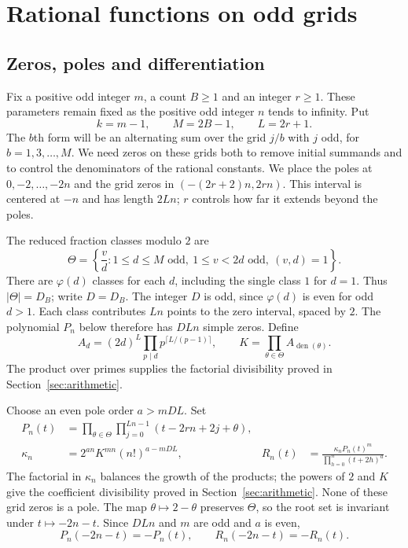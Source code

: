 \section{Rational functions on odd grids}\label{sec:construction}

\subsection{Zeros, poles and differentiation}

Fix a positive odd integer $m$, a count $B\ge1$ and an integer
$r\ge1$. These parameters remain fixed as the positive odd
integer $n$ tends to infinity. Put
\[
 k=m-1,\qquad M=2B-1,\qquad L=2r+1.
\]
The $b$th form will be an alternating sum over the grid $j/b$
with $j$ odd, for $b=1,3,\ldots,M$. We need zeros on these
grids both to remove initial summands and to control the
denominators of the rational constants.
We place the poles at $0,-2,\ldots,-2n$ and the grid zeros in
$(-(2r+2)n,2rn)$. This interval is centered at $-n$ and has
length $2Ln$; $r$ controls how far it extends beyond the poles.

The reduced fraction classes modulo $2$ are
\[
 \Theta=\left\{\frac vd:
 1\le d\le M\text{ odd},\ 1\le v<2d\text{ odd},\ (v,d)=1\right\}.
\]
There are $\varphi(d)$ classes for each $d$, including the single
class $1$ for $d=1$. Thus $|\Theta|=D_B$; write $D=D_B$.
The integer $D$ is odd, since $\varphi(d)$ is even for odd $d>1$.
Each class contributes $Ln$ points to the zero interval, spaced
by $2$. The polynomial $P_n$ below therefore has $DLn$ simple zeros.
Define
\begin{equation}\label{eq:K}
 A_d=(2d)^L\prod_{p\mid d}p^{\lceil L/(p-1)\rceil},
 \qquad K=\prod_{\theta\in\Theta}A_{\operatorname{den}(\theta)}.
\end{equation}
The product over primes supplies the factorial divisibility
proved in Section~\ref{sec:arithmetic}.

Choose an even pole order $a>mDL$. Set
\begin{align}
 P_n(t)&=\prod_{\theta\in\Theta}\prod_{j=0}^{Ln-1}
                      (t-2rn+2j+\theta),\label{eq:P}\\
 \kappa_n&=2^{an}K^{mn}(n!)^{a-mDL},
 &R_n(t)&=\frac{\kappa_nP_n(t)^m}{\prod_{h=0}^n(t+2h)^a}.
 \label{eq:R}
\end{align}
The factorial in $\kappa_n$ balances the growth of the products;
the powers of $2$ and $K$ give
the coefficient divisibility proved in Section~\ref{sec:arithmetic}.
None of these grid zeros is a pole.
The map $\theta\mapsto2-\theta$ preserves $\Theta$, so the root
set is invariant under $t\mapsto-2n-t$. Since $DLn$ and $m$
are odd and $a$ is even,
\[
 P_n(-2n-t)=-P_n(t),\qquad R_n(-2n-t)=-R_n(t).
\]

